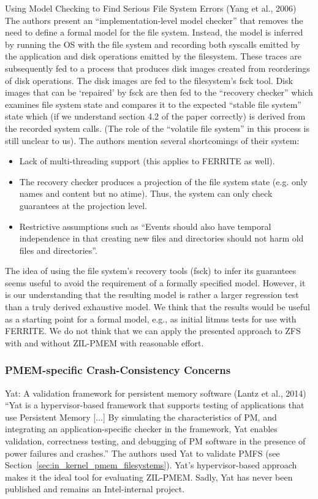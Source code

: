 \documentclass[12pt,a4paper,twoside,draft]{book}
\begin{document}
Using Model Checking to Find Serious File System Errors (Yang et al., 2006)
The authors present an “implementation-level model checker” that removes the need to define a formal model for the file system.
Instead, the model is inferred by running the OS with the file system and recording both syscalls emitted by the application and disk operations emitted by the filesystem.
These traces are subsequently fed to a process that produces disk images created from reorderings of disk operations.
The disk images are fed to the filesystem’s fsck tool.
Disk images that can be ‘repaired’ by fsck are then fed to the “recovery checker” which examines file system state and compares it to the expected “stable file system” state which (if we understand section 4.2 of the paper correctly) is derived from the recorded system calls.
(The role of the “volatile file system” in this process is still unclear to us).
The authors mention several shortcomings of their system:
\begin{itemize}
    \item Lack of multi-threading support (this applies to FERRITE as well).
    \item The recovery checker produces a projection of the file system state (e.g. only names and content but no atime).
        Thus, the system can only check guarantees at the projection level.
    \item Restrictive assumptions such as “Events should also have temporal independence in that creating new files and directories should not harm old files and directories”.
\end{itemize}
The idea of using the file system’s recovery tools (fsck) to infer its guarantees seems useful to avoid the requirement of a formally specified model.
However, it is our understanding that the resulting model is rather a larger regression test than a truly derived exhaustive model.
We think that the results would be useful as a starting point for a formal model, e.g., as initial litmus tests for use with FERRITE.
We do not think that we can apply the presented approach to ZFS with and without ZIL-PMEM with reasonable effort.

\subsubsection{PMEM-specific Crash-Consistency Concerns}

Yat: A validation framework for persistent memory software (Lantz et al., 2014)
  “Yat is a hypervisor-based framework that supports testing of applications that use Persistent Memory [...]
  By simulating the characteristics of PM, and integrating an application-specific checker in the framework, Yat enables validation, correctness testing, and debugging of PM software in the presence of power failures and crashes.”
The authors used Yat to validate PMFS (see Section~\ref{sec:in_kernel_pmem_filesystems}).
Yat's hypervisor-based approach makes it the ideal tool for evaluating ZIL-PMEM.
Sadly, Yat has never been published and remains an Intel-internal project.
\end{document}
